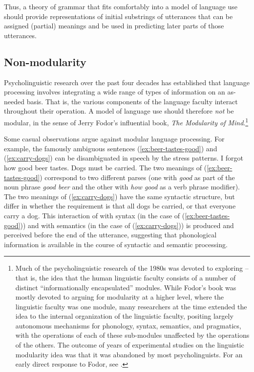 \documentclass[output=paper
	        ,collection
	        ,collectionchapter
 	        ,biblatex
                ,babelshorthands
                ,newtxmath
                ,draftmode
                ,colorlinks, citecolor=brown
]{langscibook}
\begin{document}
Thus, a theory of grammar that fits comfortably into a model of language use should provide
representations of initial substrings of utterances that can be assigned (partial) meanings and be
used in predicting later parts of those utterances. 

\subsection{Non-modularity}

Psycholinguistic research over the past four decades has established that language processing involves integrating a wide range of types of information on an as-needed basis.  That is, the
various components of the language faculty interact throughout their operation.  A model of language
use should therefore \emph{not} be modular, in the sense of Jerry Fodor's influential
\citeyear{Fodor83a-u} book, \emph{The Modularity of Mind}.\footnote{Much of the psycholinguistic
  research of the 1980s was devoted to exploring  -- that is, the idea that the
  human linguistic faculty consists of a number of distinct ``informationally encapsulated''
  modules.  While Fodor's book was mostly devoted to arguing for modularity at a higher level, where
  the linguistic faculty was one module, many researchers at the time extended the idea to the
  internal organization of the linguistic faculty, positing largely autonomous mechanisms for
  phonology, syntax, semantics, and pragmatics, with the operations of each of these sub-modules
  unaffected by the operations of the others. The outcome of years of experimental studies on the
  linguistic modularity idea was that it was abandoned by most psycholinguists. For an early direct
  response to Fodor, see \citet{MarslenTyler87}.} 

Some casual observations argue against modular language processing.  For example, the famously
ambiguous sentences (\ref{ex:beer-tastes-good}) and (\ref{ex:carry-dogs}) can be disambiguated in
speech by the stress patterns.
\eal
\ex I forgot how good beer tastes.\label{ex:beer-tastes-good}
\ex Dogs must be carried.\label{ex:carry-dogs}
\zl
The two meanings of (\ref{ex:beer-tastes-good}) correspond to two different parses (one with \emph{good} as part of the noun phrase \emph{good beer} and the other with \emph{how good} as a verb phrase modifier).  The two meanings of (\ref{ex:carry-dogs}) have the same syntactic structure, but differ in whether the requirement is that all dogs be carried, or that everyone carry a dog.  This interaction of  with syntax (in the case of (\ref{ex:beer-tastes-good})) and with semantics (in the case of (\ref{ex:carry-dogs})) is produced and perceived before the end of the utterance, suggesting that phonological information is available in the course of syntactic and semantic processing.  
\end{document}
